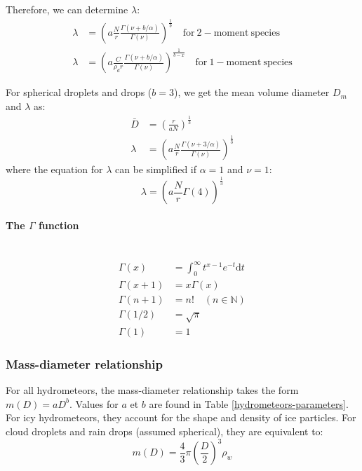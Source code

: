 Therefore, we can determine $\lambda$:
\begin{align}
 \lambda &= \left( a \frac{N}{r} \frac{\Gamma(\nu+b/\alpha)}{\Gamma(\nu)} \right)^{\frac{1}{b}} \quad \mathrm{for~2-moment~species} \\
 \lambda &= \left( a \frac{C}{\rho_d r} \frac{\Gamma(\nu+b/\alpha)}{\Gamma(\nu)} \right)^{\frac{1}{b-x}} \quad \mathrm{for~1-moment~species}
\end{align}

For spherical droplets and drops ($b=3$), we get the mean volume diameter $D_m$ and $\lambda$ as:
\begin{align}
 \bar{D} &= \left( \frac{r}{a N} \right)^{\frac{1}{3}} \\
 \lambda &= \left( a \frac{N}{r} \frac{\Gamma(\nu+3/\alpha)}{\Gamma(\nu)} \right)^{\frac{1}{3}}
\end{align}
where the equation for $\lambda$ can be simplified if $\alpha=1$ and $\nu=1$:
\begin{equation}
  \lambda = \left( a \frac{N}{r} \Gamma(4) \right)^{\frac{1}{3}}
\end{equation}

\paragraph{The $\Gamma$ function}
~\\
\begin{align}
 \Gamma(x) &= \int_0^\infty t^{x-1} e^{-t} \mathrm{d}t \\
 \Gamma(x+1) &= x\Gamma(x) \\
 \Gamma(n+1) &= n! \quad (n \in \mathbb{N}) \\
 \Gamma(1/2) &= \sqrt{\pi} \\
 \Gamma(1) &= 1
\end{align}

\subsubsection{Mass-diameter relationship}

For all hydrometeors, the mass-diameter relationship takes the form $m(D)=aD^b$. Values for $a$ et $b$ are found in Table \ref{hydrometeors-parameters}. For icy hydrometeors, they account for the shape and density of ice particles. For cloud droplets and rain drops (assumed spherical), they are equivalent to:
\begin{equation}
 \label{mD}
 m(D) = \frac{4}{3} \pi \left(\frac{D}{2}\right)^3 \rho_{w}
\end{equation}

